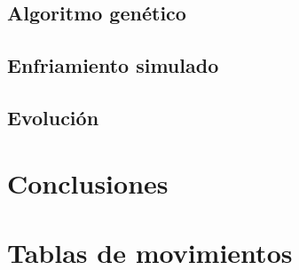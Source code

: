 \documentclass[11pt,spanish,listoffigures,listoftables]{tfgetsinf}
\begin{document}
\section{Algoritmo genético}

\section{Enfriamiento simulado}

\section{Evolución}


\chapter{Conclusiones}

\cleardoublepage
\printbibliography


\APPENDIX

\chapter{Tablas de movimientos}
\label{appendix:movimientos}
\end{document}
